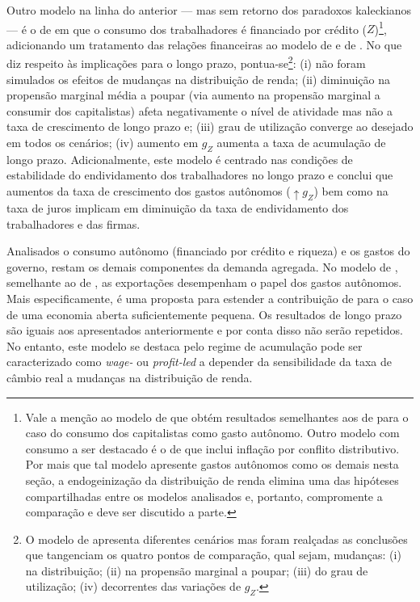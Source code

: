 

Outro modelo na linha do anterior --- mas sem retorno dos paradoxos kaleckianos --- é o de \textcite{mandarino_financing_2018} em que o consumo dos trabalhadores é financiado por crédito ($Z$)\footnote{
	Vale a menção ao modelo de \textcite{lavoie_convergence_2016} que obtém resultados semelhantes aos de \textcite{allain_tackling_2015} para o caso do consumo dos capitalistas como gasto autônomo. Outro modelo com consumo a ser destacado é o de \textcite{nah_role_2019} %
	que inclui inflação por conflito distributivo. Por mais que tal modelo apresente gastos autônomos como os demais nesta seção, a endogeinização da distribuição de renda elimina uma das hipóteses compartilhadas entre os modelos analisados e, portanto, compromente a comparação e deve ser discutido a parte.
}, adicionando um tratamento das relações financeiras ao modelo de \textcite{pariboni_household_2016} e de \textcite{fagundes_dinamica_2017}. No que diz respeito às implicações para o longo prazo, pontua-se\footnote{
	O modelo de \textcite{mandarino_financing_2018} apresenta diferentes cenários mas foram realçadas as conclusões que tangenciam os quatro pontos de comparação, qual sejam, mudanças: (i) na distribuição; (ii) na propensão marginal a poupar; (iii) do grau de utilização; (iv) decorrentes das variações de $g_Z$.
}: 
	(i) não foram simulados os efeitos de mudanças na distribuição de renda; 
	(ii) diminuição na propensão marginal média a poupar (via aumento na propensão marginal a consumir dos capitalistas) afeta negativamente o nível de atividade mas não a taxa de crescimento de longo prazo e; 
	(iii) grau de utilização converge ao desejado em todos os cenários; 
	(iv) aumento em $g_Z$ aumenta a taxa de acumulação de longo prazo.
Adicionalmente, este modelo é centrado nas condições de estabilidade do endividamento dos trabalhadores no longo prazo e conclui que aumentos da taxa de crescimento dos gastos autônomos ($\uparrow g_Z$) bem como na taxa de juros implicam em diminuição da taxa de endividamento dos trabalhadores e das firmas. 



Analisados o consumo autônomo (financiado por crédito e riqueza) e os gastos do governo, restam os demais componentes da demanda agregada.
No modelo de \textcite{nah_long-run_2017}, semelhante ao de \textcite{dejuan_hidden_2017}, as exportações desempenham o papel dos gastos autônomos. Mais especificamente, é uma proposta para estender a contribuição de \textcite{serrano_sraffian_1995} para o caso de uma economia aberta suficientemente pequena. Os resultados de longo prazo são iguais aos apresentados anteriormente e por conta disso não serão repetidos. No entanto, este modelo se destaca pelo regime de acumulação pode ser caracterizado como \textit{wage-} ou \textit{profit-led} a depender da sensibilidade da taxa de câmbio real a mudanças na distribuição de renda. 

